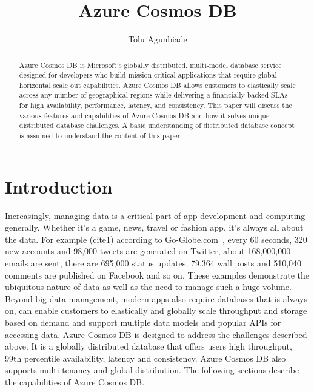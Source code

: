 
\title{Azure Cosmos DB}


\author{Tolu Agunbiade}

\renewcommand{\shortauthors}{T. Agunbiade}


\begin{abstract}
Azure Cosmos DB is Microsoft's globally distributed, multi-model
database service designed for developers who build mission-critical
applications that require global horizontal scale out
capabilities. Azure Cosmos DB allows customers to elastically scale
across any number of geographical regions while delivering a
financially-backed SLAs for high availability, performance, latency,
and consistency.  This paper will discuss the various features and
capabilities of Azure Cosmos DB and how it solves unique distributed
database challenges.  A basic understanding of distributed database
concept is assumed to understand the content of this paper.
\end{abstract}



\maketitle

\section{Introduction}
Increasingly, managing data is a critical part of app development and
computing generally. Whether it’s a game, news, travel or fashion app,
it’s always all about the data. For example (cite1) according to
Go-Globe.com~\cite{hid-sp18-501-chameleon}, every 60 seconds, 320 new
accounts and 98,000 tweets are generated on Twitter, about 168,000,000
emails are sent, there are 695,000 status updates, 79,364 wall posts
and 510,040 comments are published on Facebook and so on. These
examples demonstrate the ubiquitous nature of data as well as the need
to manage such a huge volume. Beyond big data management, modern apps
also require databases that is always on, can enable customers to
elastically and globally scale throughput and storage based on demand
and support multiple data models and popular APIs for accessing data.
Azure Cosmos DB is designed to address the challenges described
above. It is a globally distributed database that offers users high
throughput, 99th percentile availability, latency and
consistency. Azure Cosmos DB also supports multi-tenancy and global
distribution. The following sections describe the capabilities of
Azure Cosmos DB.


